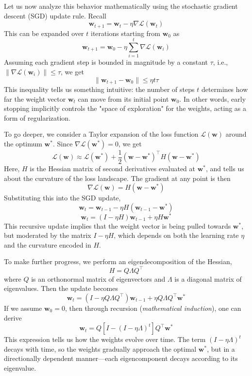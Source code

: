 Let us now analyze this behavior mathematically using the stochastic gradient descent (SGD) update rule. Recall 
\[
\mathbf{w}_{t+1} = \mathbf{w}_t - \eta \nabla \mathcal{L}(\mathbf{w}_t)
\]
This can be expanded over \( t \) iterations starting from \( \mathbf{w}_0 \) as
\[
\mathbf{w}_{t+1} = \mathbf{w}_0 - \eta \sum_{i=1}^{t} \nabla \mathcal{L}(\mathbf{w}_i)
\]
Assuming each gradient step is bounded in magnitude by a constant \( \tau \), i.e., \( \| \nabla \mathcal{L}(\mathbf{w}_i) \| \leq \tau \), we get
\[
\|\mathbf{w}_{t+1} - \mathbf{w}_0\| \leq \eta t \tau
\]
This inequality tells us something intuitive: the number of steps \( t \) determines how far the weight vector \( \mathbf{w}_t \) can move from its initial point \( \mathbf{w}_0 \). In other words, early stopping implicitly controls the "space of exploration" for the weights, acting as a form of regularization.

To go deeper, we consider a Taylor expansion of the loss function \( \mathcal{L}(\mathbf{w}) \) around the optimum \( \mathbf{w}^* \). Since \( \nabla \mathcal{L}(\mathbf{w}^*) = 0 \), we get
\[
\mathcal{L}(\mathbf{w}) \approx \mathcal{L}(\mathbf{w}^*) + \frac{1}{2} (\mathbf{w} - \mathbf{w}^*)^\top H (\mathbf{w} - \mathbf{w}^*)
\]
Here, \( H \) is the Hessian matrix of second derivatives evaluated at \( \mathbf{w}^* \), and tells us about the curvature of the loss landscape. The gradient at any point is then
\[
\nabla \mathcal{L}(\mathbf{w}) = H (\mathbf{w} - \mathbf{w}^*)
\]
Substituting this into the SGD update,
\[
\mathbf{w}_t = \mathbf{w}_{t-1} - \eta H (\mathbf{w}_{t-1} - \mathbf{w}^*)
\]
\[
\mathbf{w}_t = (I - \eta H) \mathbf{w}_{t-1} + \eta H \mathbf{w}^*
\]
This recursive update implies that the weight vector is being pulled towards \( \mathbf{w}^* \), but moderated by the matrix \( I - \eta H \), which depends on both the learning rate \( \eta \) and the curvature encoded in \( H \).

To make further progress, we perform an eigendecomposition of the Hessian,
\[
H = Q \Lambda Q^\top
\]
where \( Q \) is an orthonormal matrix of eigenvectors and \( \Lambda \) is a diagonal matrix of eigenvalues. Then the update becomes
\[
\mathbf{w}_t = (I - \eta Q \Lambda Q^\top) \mathbf{w}_{t-1} + \eta Q \Lambda Q^\top \mathbf{w}^*
\]
If we assume \( \mathbf{w}_0 = 0 \), then through recursion (\textit{mathematical induction}), one can derive 
\[
\mathbf{w}_t = Q \left[ I - (I - \eta \Lambda)^t \right] Q^\top \mathbf{w}^*
\]
This expression tells us how the weights evolve over time. The term \( (I - \eta \Lambda)^t \) decays with time, so the weights gradually approach the optimal \( \mathbf{w}^* \), but in a directionally dependent manner—each eigencomponent decays according to its eigenvalue.

